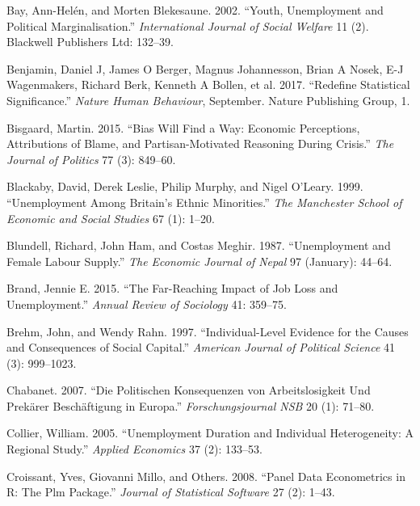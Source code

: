 \documentclass[12pt,]{article}
\begin{document}
\leavevmode\hypertarget{ref-Bay2002-fg}{}%
Bay, Ann-Helén, and Morten Blekesaune. 2002. ``Youth, Unemployment and Political Marginalisation.'' \emph{International Journal of Social Welfare} 11 (2). Blackwell Publishers Ltd: 132--39.

\leavevmode\hypertarget{ref-Benjamin2017-rf}{}%
Benjamin, Daniel J, James O Berger, Magnus Johannesson, Brian A Nosek, E-J Wagenmakers, Richard Berk, Kenneth A Bollen, et al. 2017. ``Redefine Statistical Significance.'' \emph{Nature Human Behaviour}, September. Nature Publishing Group, 1.

\leavevmode\hypertarget{ref-Bisgaard2015-xb}{}%
Bisgaard, Martin. 2015. ``Bias Will Find a Way: Economic Perceptions, Attributions of Blame, and Partisan-Motivated Reasoning During Crisis.'' \emph{The Journal of Politics} 77 (3): 849--60.

\leavevmode\hypertarget{ref-Blackaby1999-qd}{}%
Blackaby, David, Derek Leslie, Philip Murphy, and Nigel O'Leary. 1999. ``Unemployment Among Britain's Ethnic Minorities.'' \emph{The Manchester School of Economic and Social Studies} 67 (1): 1--20.

\leavevmode\hypertarget{ref-Blundell1987-qz}{}%
Blundell, Richard, John Ham, and Costas Meghir. 1987. ``Unemployment and Female Labour Supply.'' \emph{The Economic Journal of Nepal} 97 (January): 44--64.

\leavevmode\hypertarget{ref-Brand2015-rr}{}%
Brand, Jennie E. 2015. ``The Far-Reaching Impact of Job Loss and Unemployment.'' \emph{Annual Review of Sociology} 41: 359--75.

\leavevmode\hypertarget{ref-Brehm1997-qy}{}%
Brehm, John, and Wendy Rahn. 1997. ``Individual-Level Evidence for the Causes and Consequences of Social Capital.'' \emph{American Journal of Political Science} 41 (3): 999--1023.

\leavevmode\hypertarget{ref-Chabanet2007-ro}{}%
Chabanet. 2007. ``Die Politischen Konsequenzen von Arbeitslosigkeit Und Prekärer Beschäftigung in Europa.'' \emph{Forschungsjournal NSB} 20 (1): 71--80.

\leavevmode\hypertarget{ref-Collier2005-ja}{}%
Collier, William. 2005. ``Unemployment Duration and Individual Heterogeneity: A Regional Study.'' \emph{Applied Economics} 37 (2): 133--53.

\leavevmode\hypertarget{ref-Croissant2008-tb}{}%
Croissant, Yves, Giovanni Millo, and Others. 2008. ``Panel Data Econometrics in R: The Plm Package.'' \emph{Journal of Statistical Software} 27 (2): 1--43.
\end{document}

